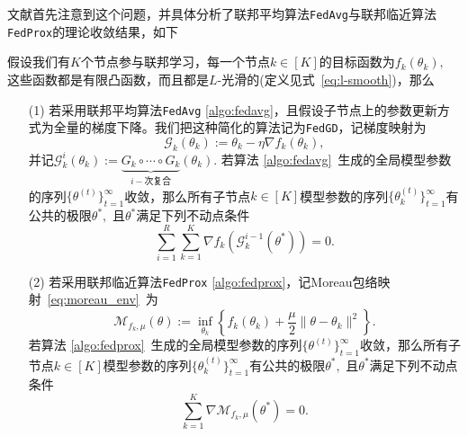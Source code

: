 文献\cite{pathak2020fedsplit}首先注意到这个问题，并具体分析了联邦平均算法\texttt{FedAvg}与联邦临近算法\texttt{FedProx}的理论收敛结果，如下

\begin{theorem}
\label{thm:fedsplit-correctness}
假设我们有$K$个节点参与联邦学习，每一个节点$k \in [K]$的目标函数为$f_k(\theta_k),$ 这些函数都是有限凸函数，而且都是$L$-光滑的(定义见式~\eqref{eq:l-smooth})，那么
\begin{itemize}
\item[(1)] 若采用联邦平均算法\texttt{FedAvg} \ref{algo:fedavg}，且假设子节点上的参数更新方式为全量的梯度下降。我们把这种简化的算法记为\texttt{FedGD}，记梯度映射为
\begin{equation}
\label{eq:grad-mapping}
\mathcal{G}_k (\theta_k) := \theta_k - \eta \nabla f_k (\theta_k),
\end{equation}
并记$\mathcal{G}^i_k (\theta_k) := \underbrace{G_k\circ\cdots\circ G_k}_{i-\text{次复合}} (\theta_k).$ 若算法 \ref{algo:fedavg}~生成的全局模型参数的序列$\{ \theta^{(t)} \}_{t=1}^{\infty}$收敛，那么所有子节点$k \in [K]$模型参数的序列$\{ \theta_k^{(t)} \}_{t=1}^{\infty}$有公共的极限$\theta^*,$ 且$\theta^*$满足下列不动点条件
\begin{equation}
\label{eq:fedgd-fixed-pt}
\sum\limits_{i=1}^R \sum\limits_{k=1}^K \nabla f_k(\mathcal{G}_k^{i-1}(\theta^*)) = 0.
\end{equation}
\item[(2)] 若采用联邦临近算法\texttt{FedProx} \ref{algo:fedprox}，记Moreau包络映射~\eqref{eq:moreau_env}~为
\begin{equation}
\label{eq:moreau-mapping}
\mathcal{M}_{f_k, \mu} (\theta) := \inf\limits_{\theta_k} \left\{ f_k(\theta_k) + \frac{\mu}{2} \lVert \theta - \theta_k \rVert^2 \right\}.
\end{equation}
若算法 \ref{algo:fedprox}~生成的全局模型参数的序列$\{ \theta^{(t)} \}_{t=1}^{\infty}$收敛，那么所有子节点$k \in [K]$模型参数的序列$\{ \theta_k^{(t)} \}_{t=1}^{\infty}$有公共的极限$\theta^*,$ 且$\theta^*$满足下列不动点条件
\begin{equation}
\label{eq:fedprox-fixed-pt}
\sum\limits_{k=1}^K \nabla \mathcal{M}_{f_k, \mu} (\theta^*) = 0.
\end{equation}
\end{itemize}
\end{theorem}

